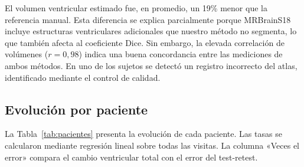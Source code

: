\documentclass[10pt]{article}
\begin{document}
El volumen ventricular estimado fue, en promedio, un 19\% menor que la referencia manual. Esta diferencia se explica parcialmente porque MRBrainS18 incluye estructuras ventriculares adicionales que nuestro método no segmenta, lo que también afecta al coeficiente Dice. Sin embargo, la elevada correlación de volúmenes ($r=0{,}98$) indica una buena concordancia entre las mediciones de ambos métodos. En uno de los sujetos se detectó un registro incorrecto del atlas, identificado mediante el control de calidad.
 
\subsection{Evolución por paciente}
 
La Tabla~\ref{tab:pacientes} presenta la evolución de cada paciente. Las tasas se calcularon mediante regresión lineal sobre todas las visitas. La columna «Veces el error» compara el cambio ventricular total con el error del test-retest.
 
\end{document}
